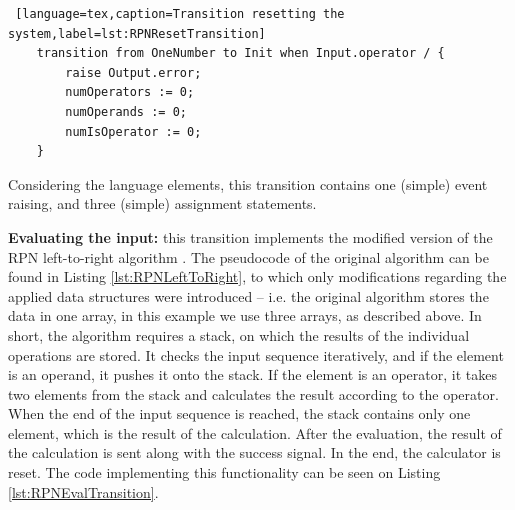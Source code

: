 \bigskip
\begin{lstlisting} [language=tex,caption=Transition resetting the system,label=lst:RPNResetTransition]
	transition from OneNumber to Init when Input.operator / {
		raise Output.error;
		numOperators := 0;
		numOperands := 0;
		numIsOperator := 0;
	}
\end{lstlisting}

Considering the language elements, this transition contains one (simple) event raising, and three (simple) assignment statements.

\textbf{Evaluating the input:} this transition implements the modified version of the RPN left-to-right algorithm \cite{ParenthesesFreeNotation}. The pseudocode of the original algorithm can be found in Listing \ref{lst:RPNLeftToRight}, to which only modifications regarding the applied data structures were introduced -- i.e. the original algorithm stores the data in one array, in this example we use three arrays, as described above. In short, the algorithm requires a stack, on which the results of the individual operations are stored. It checks the input sequence iteratively, and if the element is an operand, it pushes it onto the stack. If the element is an operator, it takes two elements from the stack and calculates the result according to the operator. When the end of the input sequence is reached, the stack contains only one element, which is the result of the calculation. After the evaluation, the result of the calculation is sent along with the success signal. In the end, the calculator is reset. The code implementing this functionality can be seen on Listing \ref{lst:RPNEvalTransition}.

